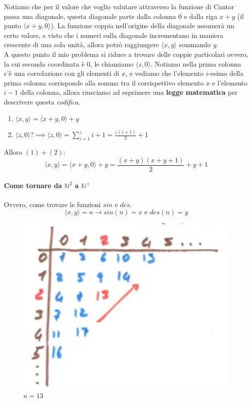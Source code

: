 \documentclass{article}
\begin{document}
Notiamo che per il valore che voglio valutare attraverso la funzione di Cantor passa una diagonale,
questa diagonale parte dalla colonna $0$ e dalla riga $x+y$ (il punto $\langle x+y,0\rangle $). La funzione
coppia nell'origine della diagonale assumerà un certo valore, e visto che i numeri sulla
diagonale incrementano in maniera crescente di una sola unità, allora potrò raggiungere $\langle x,y\rangle $
sommando $y$.\\A questo punto il mio problema si riduce a trovare delle coppie particolari ovvero,
la cui seconda coordinata è $0$, le chiamiamo $\langle z,0\rangle$. Notiamo nella prima colonna
c'è una correlazione con gli elementi di $x$, e vediamo che l'elemento $i$-esimo della prima
colonna corrisponde alla somma tra il corrispettivo elemento $x$ e l'elemento $i-1$ della colonna,
allora riusciamo ad esprimere una \textbf{legge matematica} per descrivere questa \textit{codifica}.

\begin{enumerate}
    \item $\langle x,y\rangle =\langle x+y,0\rangle +y$
    \item $\langle z,0\rangle ? \implies \langle z,0\rangle = \sum_{i=1}^z i+1=\frac{z(z+1)}{2}+1$
\end{enumerate}
\noindent Allora $(1)+(2)$:
$$\langle x,y\rangle = \langle x+y,0\rangle+y=\frac{(x+y)(x+y+1)}{2}+y+1$$

\paragraph{Come tornare da $\mathbb{N}^2$ a $\mathbb{N}^+$}
Ovvero, come trovare le funzioni $sin$ e $des$.
$$\langle x,y \rangle = n \longrightarrow sin(n)=x \text{ e } des(n)=y$$
\begin{figure}
    \centering
    \includegraphics[scale=0.5]{images/coord_dim_2.png}
    \caption{$n=13$}
\end{figure}
\end{document}
